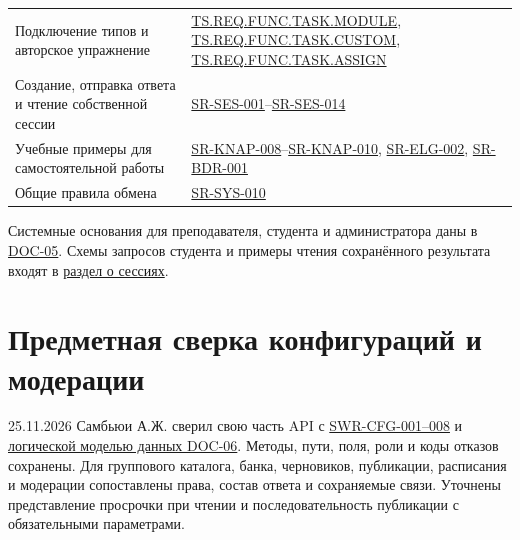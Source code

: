 \documentclass[12pt,a4paper]{article}
\begin{document}
{\begin{longtable}[]{@{}
  >{\raggedright\arraybackslash}p{}
  >{\raggedright\arraybackslash}p{}@{}}
Подключение типов и авторское упражнение & {\href{../02\_Техническое\_задание/DOC-02\_Техническое\_задание.pdf\#ts-req-func-task-module}{TS.REQ.FUNC.TASK.MODULE}}, {\href{../02\_Техническое\_задание/DOC-02\_Техническое\_задание.pdf\#ts-req-func-task-custom}{TS.REQ.FUNC.TASK.CUSTOM}}, {\href{../02\_Техническое\_задание/DOC-02\_Техническое\_задание.pdf\#ts-req-func-task-assign}{TS.REQ.FUNC.TASK.ASSIGN}} \\
Создание, отправка ответа и чтение собственной сессии & {\href{../04\_Системные\_требования/DOC-05\_Системные\_требования.pdf\#sr-ses-001}{SR-SES-001}}--{\href{../04\_Системные\_требования/DOC-05\_Системные\_требования.pdf\#sr-ses-014}{SR-SES-014}} \\
Учебные примеры для самостоятельной работы & {\href{../04\_Системные\_требования/DOC-05\_Системные\_требования.pdf\#sr-knap-008}{SR-KNAP-008}}--{\href{../04\_Системные\_требования/DOC-05\_Системные\_требования.pdf\#sr-knap-010}{SR-KNAP-010}}, {\href{../04\_Системные\_требования/DOC-05\_Системные\_требования.pdf\#sr-elg-002}{SR-ELG-002}}, {\href{../04\_Системные\_требования/DOC-05\_Системные\_требования.pdf\#sr-bdr-001}{SR-BDR-001}} \\
Общие правила обмена & {\href{../04\_Системные\_требования/DOC-05\_Системные\_требования.pdf\#sr-sys-010}{SR-SYS-010}} \\
\end{longtable}
}

Системные основания для преподавателя, студента и администратора даны в {\href{../04\_Системные\_требования/DOC-05\_Системные\_требования.pdf\#doc-05-системные-требования}{DOC-05}}. Схемы запросов студента и примеры чтения сохранённого результата входят в {\hyperlink{doc-08-справочник-api-сессии-задач}{раздел о сессиях}}.

\section{Предметная сверка конфигураций и модерации}\label{ux43fux440ux435ux434ux43cux435ux442ux43dux430ux44f-ux441ux432ux435ux440ux43aux430-ux43aux43eux43dux444ux438ux433ux443ux440ux430ux446ux438ux439-ux438-ux43cux43eux434ux435ux440ux430ux446ux438ux438}

\hypertarget{предметная-сверка-конфигураций-и-модерации}{}

25.11.2026 Самбьюи А.Ж. сверил свою часть API с {\href{../07\_Программные\_требования/DOC-06.6\_Конфигурации\_и\_модерация.pdf\#конфигурации-контрольные-мероприятия-и-модерация}{SWR-CFG-001--008}} и {\href{../07\_Программные\_требования/DOC-06\_Программные\_требования.pdf\#приложение-а-модель-данных}{логической моделью данных DOC-06}}. Методы, пути, поля, роли и коды отказов сохранены. Для группового каталога, банка, черновиков, публикации, расписания и модерации сопоставлены права, состав ответа и сохраняемые связи. Уточнены представление просрочки при чтении и последовательность публикации с обязательными параметрами.
\end{document}
